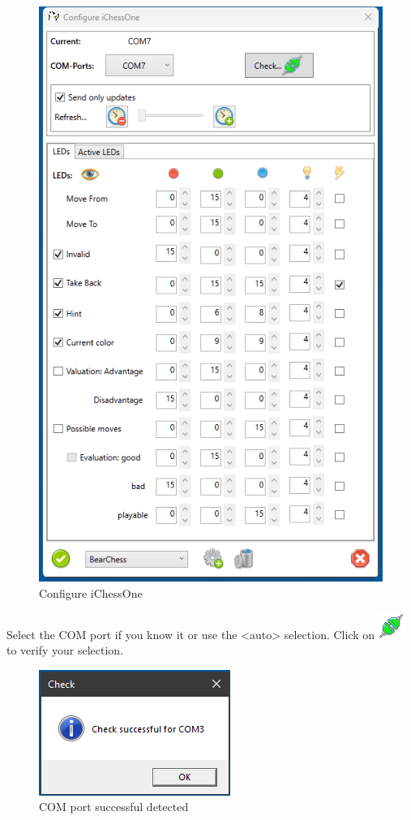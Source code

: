 \documentclass[11pt,a4paper]{article}
\begin{document}
\begin{figure}[H]
	\centering
	\includegraphics[scale=0.7]{iChessOne2.png}
	\caption{Configure iChessOne }
	\label{fig:iChessOne2}
\end{figure}


Select the COM port if you know it or use the <auto> selection.
Click on \includegraphics[scale=0.5]{connect.png} to verify your selection.

\begin{figure}[H]
	\centering
	\includegraphics[scale=1.0]{MillenniumChessLink3.png}
	\caption{COM port successful detected }
	\label{fig:iChessOne3}
\end{figure}
\end{document}
